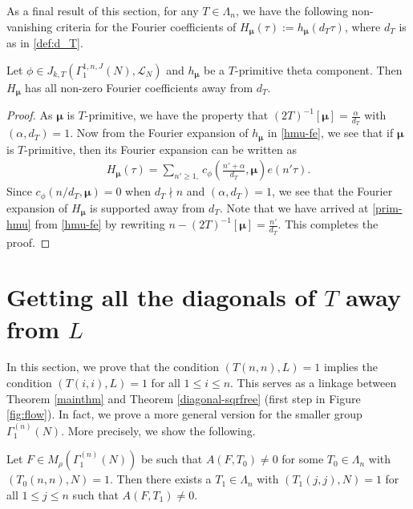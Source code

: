 \documentclass[11pt]{amsart}
\numberwithin{equation}{section}
\newcommand{\mc}{\mathcal}
\newcommand{\sumn}{\sum \nolimits}
\begin{document}
As a final result of this section, for any $T\in \Lambda_n$, we have the following non-vanishing criteria for the Fourier coefficients of $H_{\bm\mu}(\tau):=h_{\bm\mu}(d_T\tau)$, where $d_T$ is as in \eqref{def:d_T}.
\begin{lemma}\label{lem:primthetaFC}
    Let $\phi \in J_{k,T}(\Gamma_1^{1, n, J}(N), \mc L_N)$ and $h_{\bm\mu}$ be a $T$-primitive theta component. Then $H_{\bm\mu}$ has all non-zero Fourier coefficients away from $d_T$.
\end{lemma}
\begin{proof}
  As $\bm\mu$ is $T$-primitive, we have the property that $\displaystyle (2T)^{-1}[\bm\mu]= \frac\alpha{d_T}$ with $(\alpha,d_T)=1$. Now from the Fourier expansion of $h_{\bm\mu}$ in \eqref{hmu-fe}, we see that if  $\bm\mu$ is $T$-primitive, then its Fourier expansion can be written as
\begin{align} \label{prim-hmu}
    H_{\bm\mu}(\tau)=\sumn_{n' \geq 1,}c_\phi(\frac{n'+\alpha}{d_T}, \bm\mu) e(n' \tau).
\end{align}
Since $c_{\phi}(n/d_T, \bm\mu)=0$ when $d_T\nmid n$ and $(\alpha, d_T)=1$, we see that the Fourier expansion of $H_{\bm\mu}$ is supported away from $d_T$. Note that we have arrived at \eqref{prim-hmu} from \eqref{hmu-fe} by rewriting  $n- (2T)^{-1}[\bm\mu]= \frac{n'}{d_T}$. This completes the proof.
\end{proof}


\section{\texorpdfstring{Getting all the diagonals of $T$ away from $L$}{tnnimplytii}} \label{sec:tnn-diagonal}

In this section, we prove that the condition $(T(n,n), L)=1$ implies the condition $(T(i,i), L)=1$ for all $1\le i\le n$.  This serves as a linkage between Theorem \ref{mainthm} and Theorem \ref{diagonal-sqrfree} (first step in Figure \ref{fig:flow}). In fact, we prove a more general version for the smaller group $\Gamma_1^{(n)}(N)$. More precisely, we show the following.
\begin{proposition}
\label{tnn-diagonal}
Let $F\in  M_{\rho}(\Gamma_1^{(n)}(N))$ be such that $A(F, T_0)\neq 0$ for some $T_0\in\Lambda_n$ with $(T_0(n,n), N)=1$. Then there exists a $T_1\in \Lambda_n$ with $(T_1(j,j), N)=1$ for all $1\le j\le n$ such that $A(F, T_1)\neq 0$.
\end{proposition}
 
\end{document}
